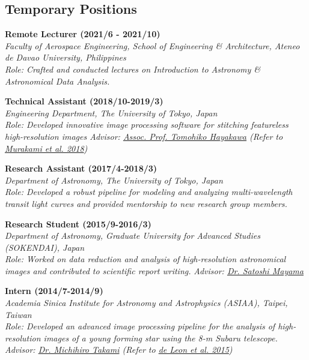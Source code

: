 \documentclass[12pt,letterpaper]{article}
\begin{document}
\subsection{Temporary Positions}
\begin{list}{}{\cvlist}
    \item
        \textbf{Remote Lecturer (2021/6 - 2021/10)} \\
        \textit{Faculty of Aerospace Engineering, School of Engineering \& Architecture, Ateneo de Davao University, Philippines} \\
        \textit{Role: Crafted and conducted lectures on Introduction to Astronomy \& Astronomical Data Analysis.}
        
    \item 
        \textbf{Technical Assistant (2018/10-2019/3)}\\
        \textit{Engineering Department, The University of Tokyo, Japan}\\
        \textit{Role: Developed innovative image processing software for stitching featureless high-resolution images 
        \textit{Advisor: \href{hayakawaurl}{Assoc. Prof. Tomohiko Hayakawa}} (Refer to \href{\spieurl}{Murakami et al. 2018})}

    \item 
        \textbf{Research Assistant (2017/4-2018/3)}\\	
        \textit{Department of Astronomy, The University of Tokyo, Japan}\\
        \textit{Role: Developed a robust pipeline for modeling and analyzing multi-wavelength transit light curves and provided mentorship to new research group members.}

    \item 
        \textbf{Research Student (2015/9-2016/3)}\\
        \textit{Department of Astronomy, Graduate University for Advanced Studies (SOKENDAI), Japan}\\
        \textit{Role: Worked on data reduction and analysis of high-resolution astronomical images and contributed to scientific report writing.}
        \textit{Advisor: \href{\mayamaurl}{Dr. Satoshi Mayama}} \\

    \item 
        \textbf{Intern (2014/7-2014/9)}\\
        \textit{Academia Sinica Institute for Astronomy and Astrophysics (ASIAA), Taipei, Taiwan}\\	
        \textit{Role: Developed an advanced image processing pipeline for the analysis of high-resolution images of a young forming star using the 8-m Subaru telescope.}
        \textit{Advisor: \href{takamiurl}{Dr. Michihiro Takami} (Refer to \href{\paperone}{de Leon et al. 2015})} \\
\end{list}
\end{document}
